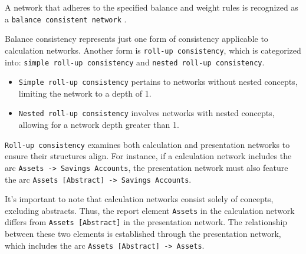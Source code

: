 
A network that adheres to the specified balance and weight rules is recognized as a \texttt{balance consistent network} \cite{fourny2023xbrl}.

\label{sec:roll_up_consistency}  
Balance consistency represents just one form of consistency applicable to calculation networks.  
Another form is \texttt{roll-up consistency}, which is categorized into: \texttt{simple roll-up consistency} and \texttt{nested roll-up consistency}.  

\begin{itemize}
    \item \texttt{Simple roll-up consistency} pertains to networks without nested concepts, limiting the network to a depth of 1.  
    \item \texttt{Nested roll-up consistency} involves networks with nested concepts, allowing for a network depth greater than 1.
\end{itemize}



\texttt{Roll-up consistency} examines both calculation and presentation networks to ensure their structures align.  
For instance, if a calculation network includes the arc \texttt{Assets -> Savings Accounts},  
the presentation network must also feature the arc \texttt{Assets [Abstract] -> Savings Accounts}.  

It's important to note that calculation networks consist solely of concepts, excluding abstracts.  
Thus, the report element \texttt{Assets} in the calculation network differs from \texttt{Assets [Abstract]} in the presentation network.  
The relationship between these two elements is established through the presentation network, which includes the arc \texttt{Assets [Abstract] -> Assets}.  

